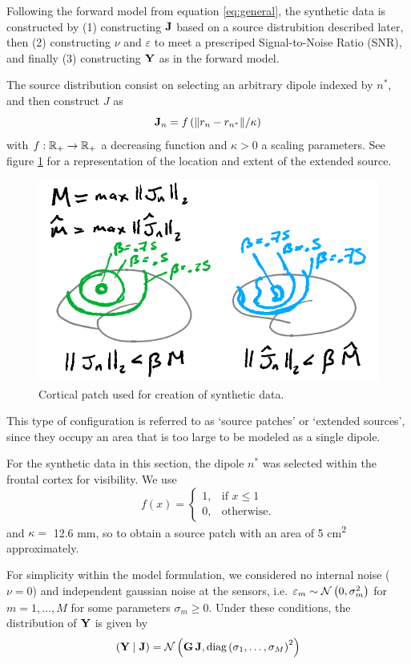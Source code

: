 Following the forward model from equation \eqref{eq:general}, the synthetic data is constructed by (1) constructing $\mathbf{J}$ based on a source distrubition described later, then (2) constructing $\nu$ and $\varepsilon$ to meet a prescriped Signal-to-Noise Ratio (SNR), and finally (3) constructing $\mathbf{Y}$ as in the forward model.

The source distribution consist on selecting an arbitrary dipole indexed by $n^*$, and then construct $J$ as
\begin{equation}
\mathbf{J}_n = f\left(  \lVert r_n-r_{n^*} \rVert / \kappa  \right)
\end{equation}
with $f:\mathbb{R}_+\rightarrow \mathbb{R}_+$ a decreasing function and $\kappa>0$ a scaling parameters.
%
See figure \ref{fig:exaple_true} for a representation of the location and extent of the extended source.

\begin{figure}
\centering
\includegraphics[width=0.8\linewidth]{./img_dev/nsCurves1}
\caption{Cortical patch used for creation of synthetic data.}
\label{fig:exaple_true}
\end{figure}

This type of configuration is referred to as `source patches' or `extended sources', since they occupy an area that is too large to be modeled as a single dipole.

For the synthetic data in this section, the dipole $n^*$ was selected within the frontal cortex for visibility.
%
We use 
\begin{equation}
f(x) = \begin{cases}
1, &\text{if } x\leq 1 \\
0, &\text{otherwise}.
\end{cases}
\end{equation}
and $\kappa = $ 12.6 \si{mm}, so to obtain a source patch with an area of 5 \si{cm^2} approximately.

For simplicity within the model formulation, we considered no internal noise ($\nu=0$) and independent gaussian noise at the sensors, i.e. $\varepsilon_m \sim\mathcal{N}\left( 0, \sigma_m^2 \right)$ for $m = 1, \dots, M$ for some parameters $\sigma_m\geq 0$.
%
Under these conditions, the distribution of $\mathbf{Y}$ is given by
\begin{equation}
\left( \mathbf{Y} \;\middle|\; \mathbf{J} \right) =
\mathcal{N}\left(  \mathbf{G}\, \mathbf{J}, \text{diag}\left(  \sigma_1, \dots, \sigma_M  \right)^2  \right)
\end{equation}

